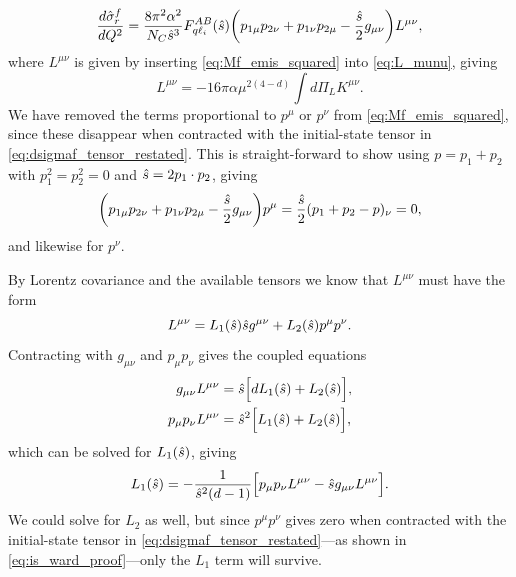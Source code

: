 \begin{equation}
    \frac{d\hat{\sigma}^f_r}{dQ^2} = \frac{8\pi^2\alpha^2}{N_C\hat{s}^3}F_{q\ell_i}^{AB}(\hat{s}) \biggl(p_{1\mu} p_{2\nu} + p_{1\nu} p_{2\mu} - \frac{\hat{s}}{2}g_{\mu\nu} \biggr) L^{\mu\nu},
    \label{eq:dsigmaf_tensor_restated}
\end{equation}
where $L^{\mu\nu}$ is given by inserting \cref{eq:Mf_emis_squared} into \cref{eq:L_munu}, giving
\begin{equation}
    L^{\mu\nu} = -16\pi\alpha\mu^{2(4-d)} \int d\Pi_L K^{\mu\nu}.
\end{equation}
We have removed the terms proportional to $p^\mu$ or $p^\nu$ from \cref{eq:Mf_emis_squared}, since these disappear when contracted with the initial-state tensor in \cref{eq:dsigmaf_tensor_restated}.
This is straight-forward to show using $p=p_1+p_2$ with $p_1^2=p_2^2=0$ and $\hat{s} = 2p_1\cdot p_2$, giving
\begin{equation}\label{eq:is_ward_proof}
    \biggl(p_{1\mu} p_{2\nu} + p_{1\nu} p_{2\mu} - \frac{\hat{s}}{2}g_{\mu\nu} \biggr)p^\mu
    = \frac{\hat{s}}{2} (p_1 + p_2 - p)_\nu
    = 0,
\end{equation}
and likewise for $p^\nu$.

By Lorentz covariance and the available tensors we know that $L^{\mu\nu}$ must have the form
\begin{equation}
    L^{\mu\nu} = L_1(\hat{s})\hat{s} g^{\mu\nu} + L_2(\hat{s}) p^\mu p^\nu.
    \label{eq:L_munu_emis}
\end{equation}
Contracting with $g_{\mu\nu}$ and $p_\mu p_\nu$ gives the coupled equations
\begin{subequations}
\begin{align}
    g_{\mu\nu}L^{\mu\nu} &= \hat{s} \Bigl[ dL_1(\hat{s}) + L_2(\hat{s}) \Bigr],
    \\
    p_\mu p_\nu L^{\mu\nu} &= \hat{s}^2 \Bigl[ L_1(\hat{s}) + L_2(\hat{s}) \Bigr],
\end{align}
\end{subequations}
which can be solved for $L_1(\hat{s})$, giving
\begin{equation}
    L_1(\hat{s}) = -\frac{1}{\hat{s}^2(d-1)} \Bigl[
        p_\mu p_\nu L^{\mu\nu}
        -\hat{s} g_{\mu\nu}L^{\mu\nu}
    \Bigr].
    \label{eq:L1_tensor}
\end{equation}
We could solve for $L_2$ as well, but since $p^\mu p^\nu$ gives zero when contracted with the initial-state tensor in \cref{eq:dsigmaf_tensor_restated}---as shown in \cref{eq:is_ward_proof}---only the $L_1$ term will survive.

